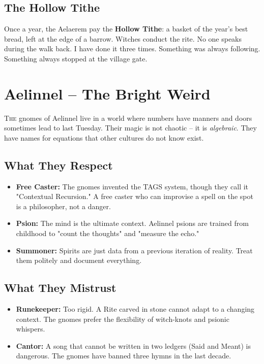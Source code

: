 \documentclass[10pt,a5paper]{book}
\begin{document}
\subsection*{The Hollow Tithe}
Once a year, the Aelaerem pay the \textbf{Hollow Tithe}: a basket of the year's best bread, left at the edge of a barrow. Witches conduct the rite. No one speaks during the walk back. I have done it three times. Something was always following. Something always stopped at the village gate.

\section{Aelinnel -- The Bright Weird}

\lettrine{T}{he} gnomes of Aelinnel live in a world where numbers have manners and doors sometimes lead to last Tuesday. Their magic is not chaotic -- it is \textit{algebraic}. They have names for equations that other cultures do not know exist.

\subsection*{What They Respect}
\begin{itemize}
    \item \textbf{Free Caster:} The gnomes invented the TAGS system, though they call it "Contextual Recursion." A free caster who can improvise a spell on the spot is a philosopher, not a danger.
    \item \textbf{Psion:} The mind is the ultimate context. Aelinnel psions are trained from childhood to "count the thoughts" and "measure the echo."
    \item \textbf{Summoner:} Spirits are just data from a previous iteration of reality. Treat them politely and document everything.
\end{itemize}

\subsection*{What They Mistrust}
\begin{itemize}
    \item \textbf{Runekeeper:} Too rigid. A Rite carved in stone cannot adapt to a changing context. The gnomes prefer the flexibility of witch-knots and psionic whispers.
    \item \textbf{Cantor:} A song that cannot be written in two ledgers (Said and Meant) is dangerous. The gnomes have banned three hymns in the last decade.
\end{itemize}
\end{document}
